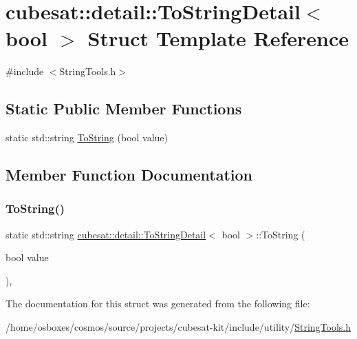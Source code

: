 \hypertarget{structcubesat_1_1detail_1_1ToStringDetail_3_01bool_01_4}{}\section{cubesat\+:\+:detail\+:\+:To\+String\+Detail$<$ bool $>$ Struct Template Reference}
\label{structcubesat_1_1detail_1_1ToStringDetail_3_01bool_01_4}


{\ttfamily \#include $<$String\+Tools.\+h$>$}

\subsection*{Static Public Member Functions}
\begin{DoxyCompactItemize}
\item 
static std\+::string \hyperlink{structcubesat_1_1detail_1_1ToStringDetail_3_01bool_01_4_a47add48edf0e43f531254c10d7ba95ba}{To\+String} (bool value)
\end{DoxyCompactItemize}


\subsection{Member Function Documentation}
\mbox{\label{structcubesat_1_1detail_1_1ToStringDetail_3_01bool_01_4_a47add48edf0e43f531254c10d7ba95ba}} 
\subsubsection{\texorpdfstring{To\+String()}{ToString()}}
{\footnotesize\ttfamily static std\+::string \hyperlink{structcubesat_1_1detail_1_1ToStringDetail}{cubesat\+::detail\+::\+To\+String\+Detail}$<$ bool $>$\+::To\+String (\begin{DoxyParamCaption}\item[{bool}]{value }\end{DoxyParamCaption})\hspace{0.3cm}{\ttfamily [inline]}, {\ttfamily [static]}}



The documentation for this struct was generated from the following file\+:\begin{DoxyCompactItemize}
\item 
/home/osboxes/cosmos/source/projects/cubesat-\/kit/include/utility/\hyperlink{StringTools_8h}{String\+Tools.\+h}\end{DoxyCompactItemize}
